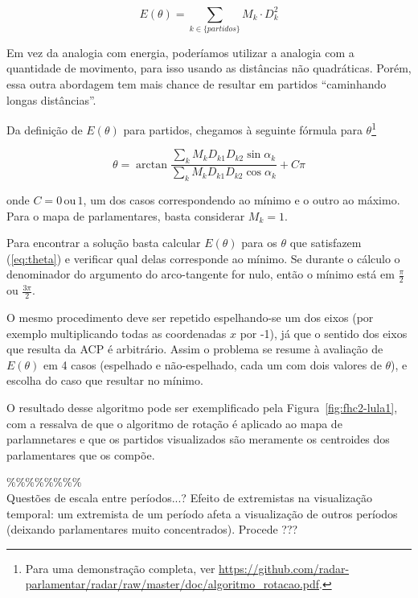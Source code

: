 \documentclass[a4paper, 12pt]{article}
\begin{document}
\begin{equation}
E(\theta)=\sum_{k\in\{partidos\}}M_{k}\cdot D_{k}^{2}\label{eq:e_theta_partidos}
\end{equation}

Em vez da analogia com energia, poderíamos utilizar a analogia com a quantidade de movimento, para isso usando as distâncias não quadráticas. Porém, essa outra abordagem tem mais chance de resultar
em partidos ``caminhando longas distâncias''.

Da definição de $E(\theta)$ para partidos, chegamos à seguinte fórmula para $\theta$\footnote{Para uma demonstração completa, ver \url{https://github.com/radar-parlamentar/radar/raw/master/doc/algoritmo_rotacao.pdf}.}

\begin{equation}
\theta=\arctan\frac{\sum_{k}M_{k}D_{k1}D_{k2}\sin\alpha_{k}}{\sum_{k}M_{k}D_{k1}D_{k2}\cos\alpha_{k}}+C\pi
\label{eq:theta}
\end{equation}

onde $C=0\mathrm{\, ou}\,1$, um dos casos correspondendo ao mínimo e o outro ao máximo. Para o mapa de parlamentares, basta considerar $M_{k} = 1$.

Para encontrar a solução basta calcular $E(\theta)$ para os $\theta$ que satisfazem (\ref{eq:theta}) e verificar qual delas corresponde ao mínimo. Se durante o cálculo o denominador do argumento do arco-tangente for nulo, então o mínimo está em $\frac{\pi}{2}$ ou $\frac{3\pi}{2}$.

O mesmo procedimento deve ser repetido espelhando-se um dos eixos (por exemplo multiplicando todas as coordenadas $x$ por -1), já que o sentido dos eixos que resulta da ACP é arbitrário. Assim o problema se resume à avaliação de $E(\theta)$ em 4 casos (espelhado e não-espelhado, cada um com dois valores de $\theta$), e escolha do caso que resultar no mínimo.

O resultado desse algoritmo pode ser exemplificado pela Figura~\ref{fig:fhc2-lula1}, com a ressalva de que o algoritmo de rotação é aplicado ao mapa de parlamnetares e que os partidos visualizados são meramente os centroides dos parlamentares que os compõe.



\%\%\%\%\%\%\%\%\\


Questões de escala entre períodos...? Efeito de extremistas na visualização temporal: um extremista de um período afeta a visualização de outros períodos (deixando parlamentares muito concentrados). Procede ???
\end{document}
